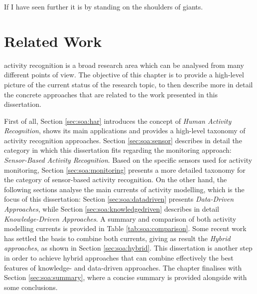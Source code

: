 

\begin{savequote}[50mm]
If I have seen further it is by standing on the shoulders of giants.
\end{savequote}

\chapter{Related Work}
\label{cha:soa}

\ifpdf
    \graphicspath{{2_state_of_the_art/figures/PDF/}{2_state_of_the_art/figures/PNG/}{2_state_of_the_art/figures/}}
\else
    \graphicspath{{2_state_of_the_art/figures/EPS/}{2_state_of_the_art/figures/}}
\fi


 activity recognition is a broad research area which can be analysed from many different points of view. The objective of this chapter is to provide a high-level picture of the current status of the research topic, to then describe more in detail the concrete approaches that are related to the work presented in this dissertation. 

First of all, Section \ref{sec:soa:har} introduces the concept of \textit{Human Activity Recognition}, shows its main applications and provides a high-level taxonomy of activity recognition approaches. Section \ref{sec:soa:sensor} describes in detail the category in which this dissertation fits regarding the monitoring approach: \textit{Sensor-Based Activity Recognition}. Based on the specific sensors used for activity monitoring, Section \ref{sec:soa:monitoring} presents a more detailed taxonomy for the category of sensor-based activity recognition. On the other hand, the following sections analyse the main currents of activity modelling, which is the focus of this dissertation: Section \ref{sec:soa:datadriven} presents \textit{Data-Driven Approaches}, while Section \ref{sec:soa:knowledgedriven} describes in detail \textit{Knowledge-Driven Approaches}. A summary and comparison of both activity modelling currents is provided in Table \ref{tab:soa:comparison}. Some recent work has settled the basis to combine both currents, giving as result the \textit{Hybrid approaches}, as shown in Section \ref{sec:soa:hybrid}. This dissertation is another step in order to achieve hybrid approaches that can combine effectively the best features of knowledge- and data-driven approaches. The chapter finalises with Section \ref{sec:soa:summary}, where a concise summary is provided alongside with some conclusions.